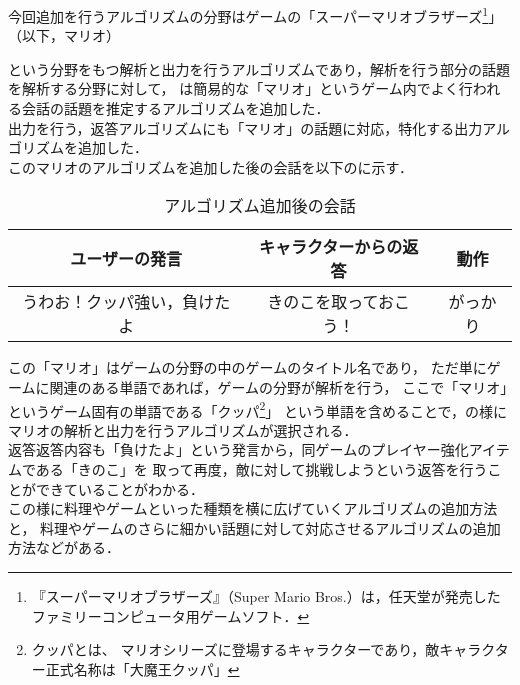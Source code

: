今回追加を行うアルゴリズムの分野はゲームの「スーパーマリオブラザーズ\footnote{『スーパーマリオブラザーズ』（Super Mario Bros.）は，任天堂が発売したファミリーコンピュータ用ゲームソフト．}」（以下，マリオ）

という分野をもつ解析と出力を行うアルゴリズムであり，解析を行う部分の話題を解析する分野に対して，
は簡易的な「マリオ」というゲーム内でよく行われる会話の話題を推定するアルゴリズムを追加した．\\

出力を行う，返答アルゴリズムにも「マリオ」の話題に対応，特化する出力アルゴリズムを追加した．\\

このマリオのアルゴリズムを追加した後の会話を以下のに示す．\\

\begin{table}[tbh]
	\caption{アルゴリズム追加後の会話} \label{tab:afterChat}
	\begin{center}
		\begin{tabular}[htb]{c|c|c}
		\hline
		ユーザーの発言 & キャラクターからの返答 & 動作 \\
		\hline
		うわお！クッパ強い，負けたよ & きのこを取っておこう！ & がっかり \\
		\hline
		\end{tabular}
	\end{center}
\end{table}

この「マリオ」はゲームの分野の中のゲームのタイトル名であり，
ただ単にゲームに関連のある単語であれば，ゲームの分野が解析を行う，
ここで「マリオ」というゲーム固有の単語である「クッパ\footnote{クッパとは、
マリオシリーズに登場するキャラクターであり，敵キャラクター正式名称は「大魔王クッパ」}」
という単語を含めることで，の様に
マリオの解析と出力を行うアルゴリズムが選択される．
\\
返答返答内容も「負けたよ」という発言から，同ゲームのプレイヤー強化アイテムである「きのこ」を
取って再度，敵に対して挑戦しようという返答を行うことができていることがわかる．
\\
この様に料理やゲームといった種類を横に広げていくアルゴリズムの追加方法と，
料理やゲームのさらに細かい話題に対して対応させるアルゴリズムの追加方法などがある．

